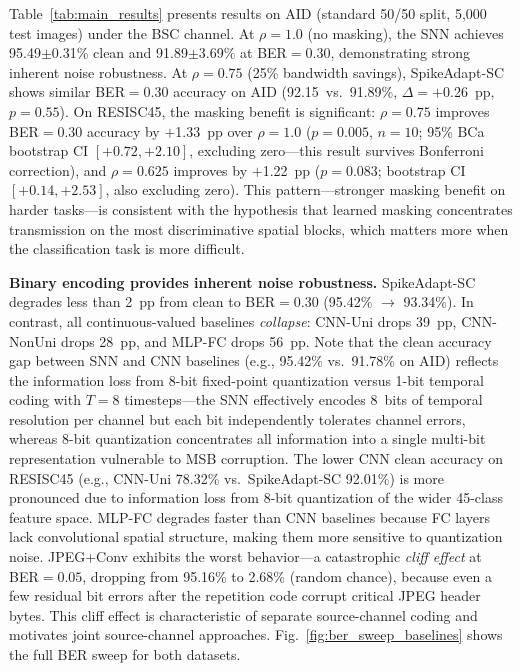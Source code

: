 \documentclass[conference]{IEEEtran}
\begin{document}
Table~\ref{tab:main_results} presents results on AID (standard 50/50 split, 5,000 test images) under the BSC channel. At $\rho{=}1.0$ (no masking), the SNN achieves 95.49$\pm$0.31\% clean and 91.89$\pm$3.69\% at BER${=}0.30$, demonstrating strong inherent noise robustness. At $\rho{=}0.75$ (25\% bandwidth savings), SpikeAdapt-SC shows similar BER${=}0.30$ accuracy on AID (92.15~vs.~91.89\%, $\Delta{=}+$0.26~pp, $p{=}0.55$). On RESISC45, the masking benefit is significant: $\rho{=}0.75$ improves BER${=}0.30$ accuracy by $+$1.33~pp over $\rho{=}1.0$ ($p{=}0.005$, $n{=}10$; 95\% BCa bootstrap CI $[+0.72, +2.10]$, excluding zero---this result survives Bonferroni correction), and $\rho{=}0.625$ improves by $+$1.22~pp ($p{=}0.083$; bootstrap CI $[+0.14, +2.53]$, also excluding zero). This pattern---stronger masking benefit on harder tasks---is consistent with the hypothesis that learned masking concentrates transmission on the most discriminative spatial blocks, which matters more when the classification task is more difficult.

\textbf{Binary encoding provides inherent noise robustness.} SpikeAdapt-SC degrades less than 2~pp from clean to BER${=}0.30$ (95.42\% $\to$ 93.34\%). In contrast, all continuous-valued baselines \emph{collapse}: CNN-Uni drops 39~pp, CNN-NonUni drops 28~pp, and MLP-FC drops 56~pp. Note that the clean accuracy gap between SNN and CNN baselines (e.g., 95.42\% vs.\ 91.78\% on AID) reflects the information loss from 8-bit fixed-point quantization versus 1-bit temporal coding with $T{=}8$ timesteps---the SNN effectively encodes 8~bits of temporal resolution per channel but each bit independently tolerates channel errors, whereas 8-bit quantization concentrates all information into a single multi-bit representation vulnerable to MSB corruption. The lower CNN clean accuracy on RESISC45 (e.g., CNN-Uni 78.32\% vs.\ SpikeAdapt-SC 92.01\%) is more pronounced due to information loss from 8-bit quantization of the wider 45-class feature space. MLP-FC degrades faster than CNN baselines because FC layers lack convolutional spatial structure, making them more sensitive to quantization noise. JPEG+Conv exhibits the worst behavior---a catastrophic \emph{cliff effect} at BER${=}0.05$, dropping from 95.16\% to 2.68\% (random chance), because even a few residual bit errors after the repetition code corrupt critical JPEG header bytes. This cliff effect is characteristic of separate source-channel coding and motivates joint source-channel approaches. Fig.~\ref{fig:ber_sweep_baselines} shows the full BER sweep for both datasets.
\end{document}
